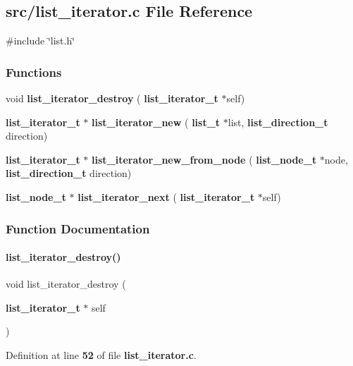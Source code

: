 \subsection{src/list\+\_\+iterator.c File Reference}
\label{a00113}
{\ttfamily \#include \char`\"{}list.\+h\char`\"{}}\newline
\subsubsection*{Functions}
\begin{DoxyCompactItemize}
\item 
void \textbf{ list\+\_\+iterator\+\_\+destroy} (\textbf{ list\+\_\+iterator\+\_\+t} $\ast$self)
\item 
\textbf{ list\+\_\+iterator\+\_\+t} $\ast$ \textbf{ list\+\_\+iterator\+\_\+new} (\textbf{ list\+\_\+t} $\ast$list, \textbf{ list\+\_\+direction\+\_\+t} direction)
\item 
\textbf{ list\+\_\+iterator\+\_\+t} $\ast$ \textbf{ list\+\_\+iterator\+\_\+new\+\_\+from\+\_\+node} (\textbf{ list\+\_\+node\+\_\+t} $\ast$node, \textbf{ list\+\_\+direction\+\_\+t} direction)
\item 
\textbf{ list\+\_\+node\+\_\+t} $\ast$ \textbf{ list\+\_\+iterator\+\_\+next} (\textbf{ list\+\_\+iterator\+\_\+t} $\ast$self)
\end{DoxyCompactItemize}


\subsubsection{Function Documentation}
\mbox{\label{a00113_ad16fa29ddbb444070ea65f871e1c0ba2}} 
\paragraph{list\+\_\+iterator\+\_\+destroy()}
{\footnotesize\ttfamily void list\+\_\+iterator\+\_\+destroy (\begin{DoxyParamCaption}\item[{\textbf{ list\+\_\+iterator\+\_\+t} $\ast$}]{self }\end{DoxyParamCaption})}



Definition at line \textbf{ 52} of file \textbf{ list\+\_\+iterator.\+c}.



